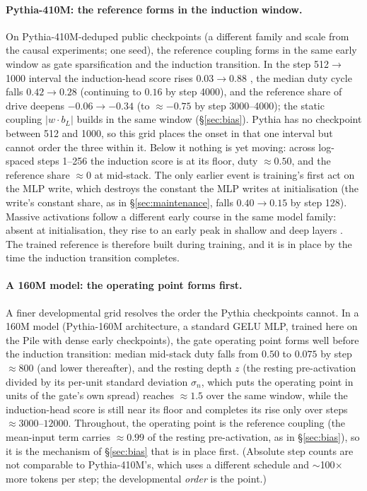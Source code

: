 \documentclass[11pt]{article}
\newcommand{\bl}{b_L}
\begin{document}
\paragraph{Pythia-410M: the reference forms in the induction window.}
On Pythia-410M-deduped public checkpoints (a different family and scale
from the causal experiments; one seed), the reference coupling forms in
the same early window as gate sparsification and the induction
transition. In the step 512$\to$1000 interval the induction-head score
rises $0.03 \to 0.88$ \citep{olsson2022}, the median duty cycle falls
$0.42 \to 0.28$ (continuing to $0.16$ by step 4000), and the reference
share of drive deepens $-0.06 \to -0.34$ (to $\approx -0.75$ by
step 3000--4000); the static coupling $|w\cdot\bl|$ builds in the same
window (\S\ref{sec:bias}). Pythia has no checkpoint between 512 and 1000, so this
grid places the onset in that one interval but cannot order the three
within it. Below it nothing is yet moving: across log-spaced steps
1--256 the induction score is at its floor, duty $\approx 0.50$, and the
reference share $\approx 0$ at mid-stack. The only earlier event is
training's first act on the MLP write, which destroys the constant the MLP writes at
initialisation (the write's constant share, as in \S\ref{sec:maintenance},
falls $0.40 \to 0.15$ by step 128). Massive activations follow a
different early course in the same model family: absent at
initialisation, they rise to an early peak in shallow and deep layers
\citep{gallego2025}. The trained reference is therefore built during
training, and it is in place by the time the induction transition
completes.

\paragraph{A 160M model: the operating point forms first.} A finer
developmental grid resolves the order the Pythia checkpoints cannot. In
a 160M model (Pythia-160M architecture, a standard GELU MLP, trained
here on the Pile with dense early checkpoints), the gate operating point
forms well before the induction transition: median mid-stack duty falls
from $0.50$ to $0.075$ by step $\approx 800$ (and lower thereafter), and
the resting depth $z$ (the resting pre-activation divided by its
per-unit standard deviation $\sigma_n$, which puts the operating point in
units of the gate's own spread) reaches $\approx 1.5$ over the same window, while
the induction-head score is still near its floor and completes its rise
only over steps $\approx 3000$--$12000$. Throughout, the operating point is the reference
coupling (the mean-input term carries $\approx 0.99$ of the resting
pre-activation, as in \S\ref{sec:bias}), so it is the mechanism of
\S\ref{sec:bias} that is in place first. (Absolute step counts are not
comparable to Pythia-410M's, which uses a different schedule and
$\sim$100$\times$ more tokens per step; the developmental \emph{order}
is the point.)
\end{document}
